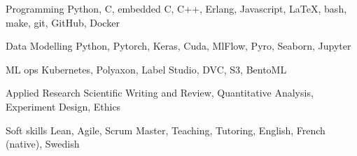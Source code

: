 

\begin{cvskills}


  \cvskill
    {Programming} %
    {Python, C, embedded C, C++, Erlang, Javascript, \LaTeX{}, bash, make, git, GitHub, Docker} %

  \cvskill
    {Data Modelling} %
    {Python, Pytorch, Keras, Cuda, MlFlow, Pyro, Seaborn, Jupyter} %

  \cvskill
    {ML ops} %
    {Kubernetes, Polyaxon, Label Studio, DVC, S3, BentoML} %

  \cvskill
    {Applied Research} %
    {Scientific Writing and Review, Quantitative Analysis, Experiment Design, Ethics} %

  \cvskill
    {Soft skills} %
    {Lean, Agile, Scrum Master, Teaching, Tutoring, English, French (native), Swedish} %



\end{cvskills}
